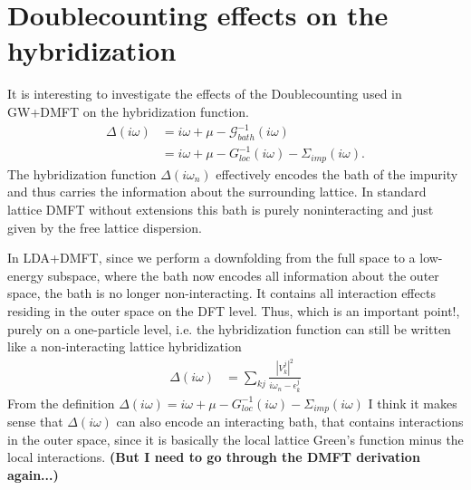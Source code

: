 \documentclass[12pt,a4paper]{scrartcl}
\numberwithin{equation}{section}
\begin{document}

\section{Doublecounting effects on the hybridization}

It is interesting to investigate the effects of the Doublecounting
used in GW+DMFT on the hybridization function.
\begin{align}
\Delta(i\omega) &= i\omega + \mu - \mathscr{G}_{bath}^{-1}(i\omega) \\
&= i\omega + \mu - G_{loc}^{-1}(i\omega) - \Sigma_{imp}(i\omega).
\end{align}
The hybridization function $\Delta(i\omega_n)$ effectively encodes the bath
of the impurity and thus carries the information about the surrounding lattice.
In standard lattice DMFT without extensions this bath is purely noninteracting
and just given by the free lattice dispersion.

In LDA+DMFT, since we perform a downfolding from the full space
to a low-energy subspace, where the bath now encodes all information 
about the outer space, the bath is no longer non-interacting.
It contains all interaction effects residing in the outer space
on the DFT level. Thus, which is an important point!, purely
on a one-particle level, i.e. the hybridization function can still 
be written like a non-interacting lattice hybridization
\begin{align}
\Delta(i\omega) &= \sum_{kj} \frac{|V^j_k|^2}{i\omega_n - \epsilon_k^j}
\end{align}
From the definition 
$\Delta(i\omega) = i\omega + \mu - G_{loc}^{-1}(i\omega) - \Sigma_{imp}(i\omega)$
I think it makes sense that $\Delta(i\omega)$ can also encode an interacting
bath, that contains interactions in the outer space,
since it is basically the local lattice Green's function minus the local interactions.
\textbf{(But I need to go through
the DMFT derivation again...)}

\bigskip
\end{document}
